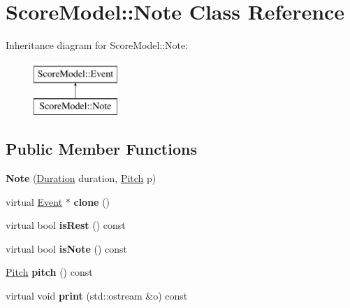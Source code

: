 \hypertarget{classScoreModel_1_1Note}{}\section{Score\+Model\+::Note Class Reference}
\label{classScoreModel_1_1Note}
Inheritance diagram for Score\+Model\+::Note\+:\begin{figure}[H]
\begin{center}
\leavevmode
\includegraphics[height=2.000000cm]{classScoreModel_1_1Note}
\end{center}
\end{figure}
\subsection*{Public Member Functions}
\begin{DoxyCompactItemize}
\item 
\mbox{\label{classScoreModel_1_1Note_aa7d86cdc998547a3b0e3cf5688b912b0}} 
{\bfseries Note} (\mbox{\hyperlink{classScoreModel_1_1Duration}{Duration}} duration, \mbox{\hyperlink{classPitch}{Pitch}} p)
\item 
\mbox{\label{classScoreModel_1_1Note_a8b9cd623f7bcfc453c1122eed44d2771}} 
virtual \mbox{\hyperlink{classScoreModel_1_1Event}{Event}} $\ast$ {\bfseries clone} ()
\item 
\mbox{\label{classScoreModel_1_1Note_a26861448aca7b3cb10fff77bc82e2425}} 
virtual bool {\bfseries is\+Rest} () const
\item 
\mbox{\label{classScoreModel_1_1Note_ae8db3157671fd89bfd16a4d23163e7f3}} 
virtual bool {\bfseries is\+Note} () const
\item 
\mbox{\label{classScoreModel_1_1Note_a7639ee94233d351ab99cab1511e6caa4}} 
\mbox{\hyperlink{classPitch}{Pitch}} {\bfseries pitch} () const
\item 
\mbox{\label{classScoreModel_1_1Note_a9479c02d613a1ebdb30d8e93cdb45516}} 
virtual void {\bfseries print} (std\+::ostream \&o) const
\end{DoxyCompactItemize}
